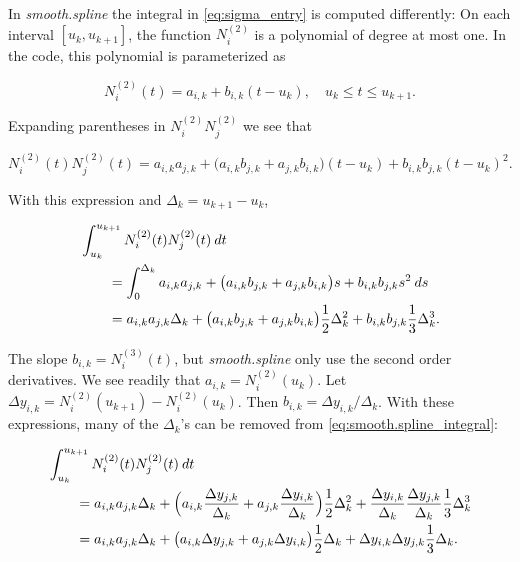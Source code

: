 \documentclass[a4paper]{scrartcl}
\newcommand\dd{\ensuremath{\:d}}
\begin{document}
In \textit{smooth.spline} the integral in \cref{eq:sigma_entry} is computed differently:
On each interval $[u_k, u_{k+1}]$, the function $N_i^{(2)}$ is a polynomial of degree at most one.
In the code, this polynomial is parameterized as

\begin{equation*}
    N_i^{(2)}(t) 
    = a_{i,k} + b_{i,k} (t - u_k), 
    \quad u_k\leq t\leq u_{k+1}.
\end{equation*}

Expanding parentheses in $N_i^{(2)} N_j^{(2)}$ we see that

\begin{equation*}
    N_i^{(2)}(t) N_j^{(2)}(t)
    = a_{i,k} a_{j,k} + \bigl(a_{i,k} b_{j,k} + a_{j,k} b_{i,k}\bigr) (t - u_k) + b_{i,k} b_{j,k} (t - u_k)^2.
\end{equation*}

With this expression and $\Delta_k = u_{k+1} - u_k$,

\begin{align}
    \MoveEqLeft
    \int_{u_k}^{u_{k+1}} N_i^{(2)}(t) N_j^{(2)}(t) \dd t 
    \nonumber
    \\
    & = \int_0^{\Delta_k} a_{i,k} a_{j,k} + \bigl(a_{i,k} b_{j,k} + a_{j,k} b_{i,k}\bigr) s + b_{i,k} b_{j,k} s^2 \dd s 
    \nonumber
    \\
    & = a_{i,k} a_{j,k} \Delta_k + \bigl(a_{i,k} b_{j,k} + a_{j,k} b_{i,k}\bigr) \frac12 \Delta_k^2 + b_{i,k} b_{j,k} \frac13 \Delta_k^3.
    \label{eq:smooth.spline_integral}
\end{align}

The slope $b_{i,k} = N_i^{(3)}(t)$, but \textit{smooth.spline} only use the second order derivatives.
We see readily that $a_{i,k} = N_i^{(2)}(u_k)$.
Let $\Delta y_{i,k} = N_i^{(2)}(u_{k+1}) - N_i^{(2)}(u_k)$.
Then $b_{i,k} = \Delta y_{i,k} / \Delta_k$.
With these expressions, many of the $\Delta_k$'s can be removed from \cref{eq:smooth.spline_integral}:

\begin{align*}
    \MoveEqLeft
    \int_{u_k}^{u_{k+1}} N_i^{(2)}(t) N_j^{(2)}(t) \dd t 
    \\
    & = a_{i,k} a_{j,k} \Delta_k + \Bigl(a_{i,k} \frac{\Delta y_{j,k}}{\Delta_k} + a_{j,k} \frac{\Delta y_{i,k}}{\Delta_k}\Bigr) \frac12 \Delta_k^2 + \frac{\Delta y_{i,k}}{\Delta_k} \frac{\Delta y_{j,k}}{\Delta_k} \frac13 \Delta_k^3
    \\
    & = a_{i,k} a_{j,k} \Delta_k + \bigl(a_{i,k} \Delta y_{j,k} + a_{j,k} \Delta y_{i,k}\bigr) \frac12 \Delta_k + \Delta y_{i,k} \Delta y_{j,k} \frac13 \Delta_k.
\end{align*}
\end{document}
